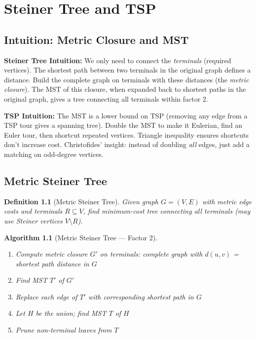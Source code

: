\documentclass[11pt,oneside]{book}
\newtheorem{definition}[theorem]{Definition}
\newtheorem{algorithmdef}[theorem]{Algorithm}
\begin{document}
\chapter{Steiner Tree and TSP}
\label{ch:steiner_tsp}

\section{Intuition: Metric Closure and MST}

\begin{intuitionbox}
\textbf{Steiner Tree Intuition:} We only need to connect the \emph{terminals} (required vertices). The shortest path between two terminals in the original graph defines a distance. Build the complete graph on terminals with these distances (the \emph{metric closure}). The MST of this closure, when expanded back to shortest paths in the original graph, gives a tree connecting all terminals within factor 2.

\textbf{TSP Intuition:} The MST is a lower bound on TSP (removing any edge from a TSP tour gives a spanning tree). Double the MST to make it Eulerian, find an Euler tour, then shortcut repeated vertices. Triangle inequality ensures shortcuts don't increase cost. Christofides' insight: instead of doubling \emph{all} edges, just add a matching on odd-degree vertices.
\end{intuitionbox}

\section{Metric Steiner Tree}

\begin{definition}[Metric Steiner Tree]
Given graph $G = (V, E)$ with metric edge costs and terminals $R \subseteq V$, find minimum-cost tree connecting all terminals (may use Steiner vertices $V \setminus R$).
\end{definition}

\begin{algorithmdef}[Metric Steiner Tree — Factor 2]
\begin{enumerate}
    \item Compute metric closure $G'$ on terminals: complete graph with $d(u,v)$ = shortest path distance in $G$
    \item Find MST $T'$ of $G'$
    \item Replace each edge of $T'$ with corresponding shortest path in $G$
    \item Let $H$ be the union; find MST $T$ of $H$
    \item Prune non-terminal leaves from $T$
\end{enumerate}
\end{algorithmdef}
\end{document}
